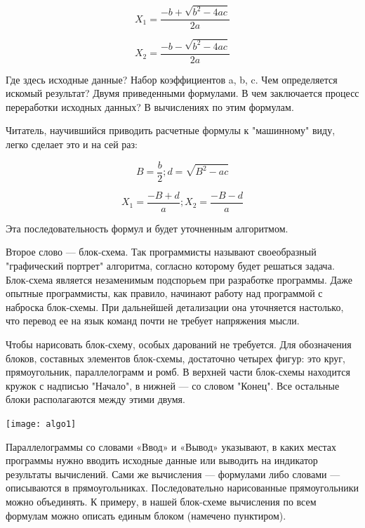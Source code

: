 \documentclass[11pt,a4paper,oneside]{article}
\begin{document}
\begin{equation}
X_{1}=\frac{-b+\sqrt{b^{2}-4ac}}{2a}
\end{equation}

\begin{equation}
X_{2}=\frac{-b-\sqrt{b^{2}-4ac}}{2a}
\end{equation}

Где здесь исходные данные? Набор коэффициентов a, b, c. Чем определяется искомый результат? Двумя приведенными формулами. В чем заключается процесс переработки исходных данных? В вычислениях по этим формулам.

Читатель, научившийся приводить расчетные формулы к "машинному" виду, легко сделает это и на сей раз:

\begin{equation}
B=\frac{b}{2} ; d=\sqrt{B^{2}-ac}
\end{equation}

\begin{equation}
X_{1}=\frac{-B+d}{a}; X_{2}=\frac{-B-d}{a}
\end{equation}

Эта последовательность формул и будет уточненным алгоритмом.

Второе слово — блок-схема. Так программисты называют своеобразный "графический портрет" алгоритма, согласно которому будет решаться задача. Блок-схема является незаменимым подспорьем при разработке программы. Даже опытные программисты, как правило, начинают работу над программой с наброска блок-схемы. При дальнейшей детализации она уточняется настолько, что перевод ее на язык команд почти не требует напряжения мысли.

Чтобы нарисовать блок-схему, особых дарований не требуется. Для обозначения блоков, составных элементов блок-схемы, достаточно четырех фигур: это круг, прямоугольник, параллелограмм и ромб. В верхней части блок-схемы находится кружок с надписью "Начало", в нижней — со словом "Конец". Все остальные блоки располагаются между этими двумя.

\texttt{[image: algo1]}

Параллелограммы со словами «Ввод» и «Вывод» указывают, в каких местах программы нужно вводить исходные данные или выводить на индикатор результаты вычислений. Сами же вычисления — формулами либо словами — описываются в прямоугольниках. Последовательно нарисованные прямоугольники можно объединять. К примеру, в нашей блок-схеме вычисления по всем формулам можно описать единым блоком (намечено пунктиром).
\end{document}
